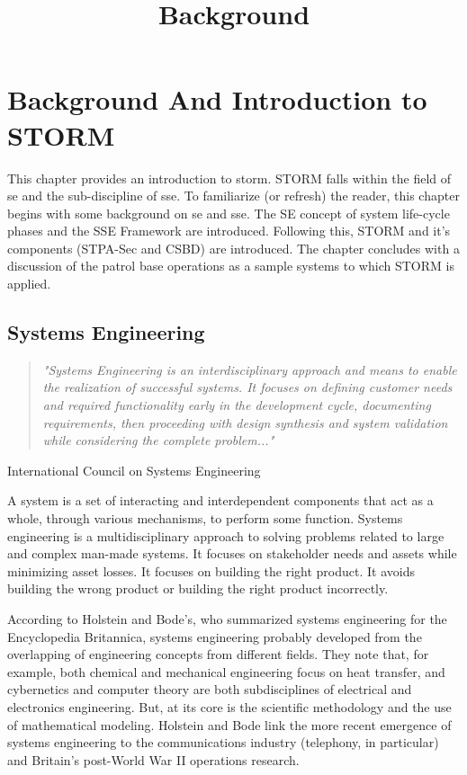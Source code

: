 \documentclass[../../main/main.tex]{subfiles}
\begin{document}
\title{Background}


\chapter{Background And Introduction to STORM}\label{chp:srorm}
This chapter provides an introduction to \Gls{storm}.  STORM falls within the field of \Gls{se} and the sub-discipline of \Gls{sse}. To familiarize (or refresh) the reader, this chapter begins with some background on \Gls{se} and \Gls{sse}.  The SE concept of system life-cycle phases and the SSE Framework are introduced.  Following this, STORM and it's components (STPA-Sec and CSBD) are introduced.  The chapter concludes with a discussion of the patrol base operations as a sample systems to which STORM is applied.

\section{Systems Engineering}\label{sec:stormse}
\begin{quote}
\textit{"Systems Engineering is an interdisciplinary approach and means to enable the realization of successful systems. It focuses on defining customer needs and required functionality early in the development cycle, documenting requirements, then proceeding with design synthesis and system validation while considering the complete problem..."
}\end{quote}
International Council on Systems Engineering 

A system is a set of interacting and interdependent components that act as a whole,  through various mechanisms, to perform some function. Systems engineering is a multidisciplinary approach to solving problems related to large and complex man-made systems.  It focuses on stakeholder needs and assets while minimizing asset losses.  It focuses on building the right product.  It avoids building the wrong product or building the right product incorrectly.  

According to Holstein and Bode's, who summarized systems engineering for the Encyclopedia Britannica, systems engineering probably developed from the overlapping of engineering concepts from different fields. They note that, for example, both chemical and mechanical engineering focus on heat transfer, and cybernetics and computer theory are both subdisciplines of electrical and electronics engineering.   But, at its core is the scientific methodology and the use of mathematical modeling.  Holstein and Bode link the more recent emergence of systems engineering to the communications industry (telephony, in particular) and Britain's post-World War II operations research.
\end{document}
